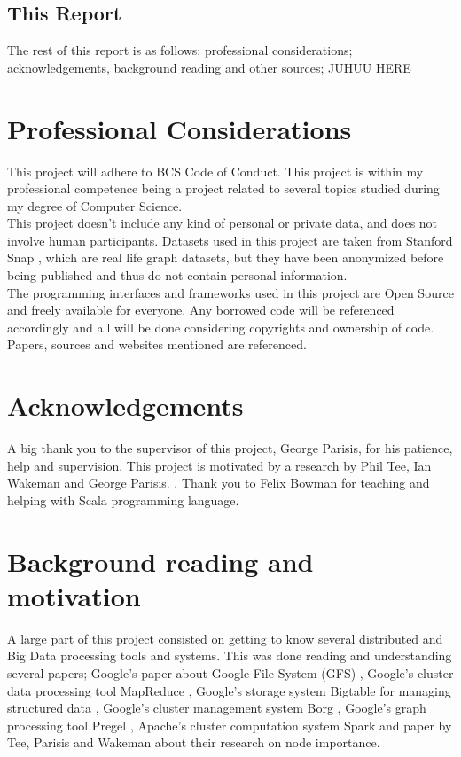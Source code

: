 \documentclass{article}
\theoremstyle{definition}
\begin{document}
\subsection{This Report}
The rest of this report is as follows; professional considerations; acknowledgements, background reading and other sources; JUHUU HERE \\


\section{Professional Considerations}
This project will adhere to BCS Code of Conduct. This project is within my professional competence being a project related to several topics studied during my degree of Computer Science. \\

This project doesn't include any kind of personal or private data, and does not involve human participants. Datasets used in this project are taken from Stanford Snap \cite{snap}, which are real life graph datasets, but they have been anonymized before being published and thus do not contain personal information. \\

The programming interfaces and frameworks used in this project are Open Source and freely available for everyone. Any borrowed code will be referenced accordingly and all will be done considering copyrights and ownership of code. Papers, sources and websites mentioned are referenced. \\

\section{Acknowledgements}
A big thank you to the supervisor of this project, George Parisis, for his patience, help and supervision. This project is motivated by a research by Phil Tee, Ian Wakeman and George Parisis. \cite{Tee2016b}. Thank you to Felix Bowman for teaching and helping with Scala programming language. \\ 

\section{Background reading and motivation}
A large part of this project consisted on getting to know several distributed and Big Data processing tools and systems. This was done reading and understanding several papers; Google's paper about Google File System (GFS) \cite{Ghemawat2003}, Google's cluster data processing tool MapReduce \cite{Dean}, Google's storage system Bigtable for managing structured data \cite{Chang}, Google's cluster management system Borg \cite{Verma}, Google's graph processing tool Pregel \cite{Malewicz2010}, Apache's cluster computation system Spark \cite{Zaharia2012} and paper by Tee, Parisis and Wakeman \cite{Tee2016b} about their research on node importance. 
\end{document}
